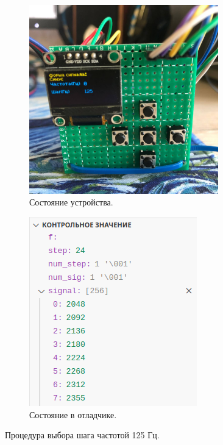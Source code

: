 	\begin{figure}[H]\captionsetup[subfigure]{font=normalsize}
     \begin{subfigure}[H]{0.5\textwidth}
         \centering
         \includegraphics[width=0.9\textwidth]{../image/test1_u_st.jpg}
         \caption{Состояние устройства.}
     \end{subfigure}
     \hfill
     \begin{subfigure}[H]{0.5\textwidth}
         \centering
         \includegraphics[width=0.8\textwidth]{../image/test1_o_st.png}
         \caption{Состояние в отладчике.}
     \end{subfigure}
        \caption{Процедура выбора шага частотой 125 Гц.}
	\end{figure}
	
